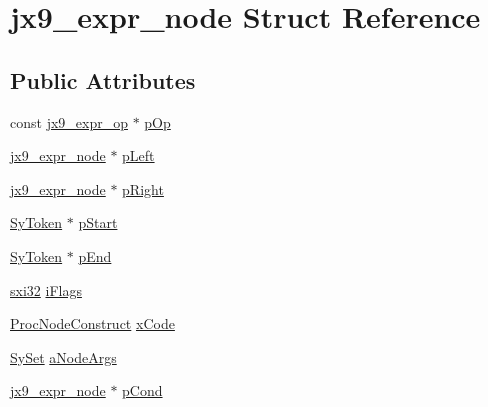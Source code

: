 \hypertarget{structjx9__expr__node}{\section{jx9\-\_\-expr\-\_\-node Struct Reference}
\label{d4/d70/structjx9__expr__node}
}
\subsection*{Public Attributes}
\begin{DoxyCompactItemize}
\item 
const \hyperlink{structjx9__expr__op}{jx9\-\_\-expr\-\_\-op} $\ast$ \hyperlink{structjx9__expr__node_a2ef888861a61fa6731d27ce68e567207}{p\-Op}
\item 
\hyperlink{structjx9__expr__node}{jx9\-\_\-expr\-\_\-node} $\ast$ \hyperlink{structjx9__expr__node_a70ba1eaf53db80fb88a7ad1968dbbd76}{p\-Left}
\item 
\hyperlink{structjx9__expr__node}{jx9\-\_\-expr\-\_\-node} $\ast$ \hyperlink{structjx9__expr__node_a87663c2aabfebf444ec6d5baf4c75cc0}{p\-Right}
\item 
\hyperlink{struct_sy_token}{Sy\-Token} $\ast$ \hyperlink{structjx9__expr__node_a8f818961af71cd65469582f5dcc36799}{p\-Start}
\item 
\hyperlink{struct_sy_token}{Sy\-Token} $\ast$ \hyperlink{structjx9__expr__node_af7371d7052e4f4bb0cf06449fbed11d7}{p\-End}
\item 
\hyperlink{unqlite_8c_a5a58035d4ae379178e2ca46cc3272fc5}{sxi32} \hyperlink{structjx9__expr__node_a08c63001bf826cb5ed5086718b9dff4b}{i\-Flags}
\item 
\hyperlink{unqlite_8c_ad2221ad32b323e5a88c588e994ed199a}{Proc\-Node\-Construct} \hyperlink{structjx9__expr__node_af7e91e818d8df125904493dc93534a9f}{x\-Code}
\item 
\hyperlink{struct_sy_set}{Sy\-Set} \hyperlink{structjx9__expr__node_a1fb898e82103d438ea2b7288d57973c4}{a\-Node\-Args}
\item 
\hyperlink{structjx9__expr__node}{jx9\-\_\-expr\-\_\-node} $\ast$ \hyperlink{structjx9__expr__node_ac9538bc9e1a286d66bff3802090f396a}{p\-Cond}
\end{DoxyCompactItemize}


